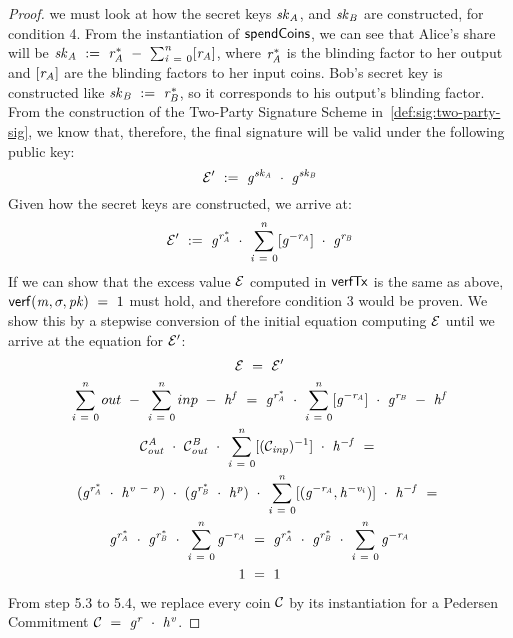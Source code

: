 \begin{proof}
    we must look at how the secret keys $\mathit{sk}_{\mathit{A}}$, and $\mathit{sk}_{\mathit{B}}$ are constructed, for condition 4.
    From the instantiation of $\mathsf{spendCoins}$, we can see that Alice's share will be $\mathit{sk}_{\mathit{A}} ~:=~ \mathit{r}_{\mathit{A}}^* ~-~ \sum_{\mathit{i} ~=~ 0}^{\mathit{n}} [\mathit{r}_{\mathit{A}}]$, where $\mathit{r}_{\mathit{A}}^*$ is the blinding factor to her output and $[\mathit{r}_{\mathit{A}}]$ are the blinding factors to her input coins.
    Bob's secret key is constructed like $\mathit{sk}_{\mathit{B}} ~:=~ \mathit{r}_{\mathit{B}}^*$, so it corresponds to his output's blinding factor.
    From the construction of the Two-Party Signature Scheme in~\cref{def:sig:two-party-sig}, we know that, therefore, the final signature will be valid under the following public key:
    \[ {\mathcal{E}}' ~:=~ \mathit{g}^{\mathit{sk}_{\mathit{A}}} ~\cdot~ \mathit{g}^{\mathit{sk}_{\mathit{B}}} \]
    Given how the secret keys are constructed, we arrive at:
    \[ {\mathcal{E}}' ~:=~ \mathit{g}^{\mathit{r}_{\mathit{A}}^*} ~\cdot~ \sum_{\mathit{i} ~=~ 0}^{\mathit{n}} [\mathit{g}^{- \mathit{r}_{\mathit{A}}}] ~\cdot~ \mathit{g}^{\mathit{r}_{\mathit{B}}} \]
    If we can show that the excess value $\mathcal{E}$ computed in $\mathsf{verfTx}$ is the same as above, $\mathsf{verf}(\mathit{m}, \sigma, \mathit{pk}) ~=~ 1$ must hold, and therefore condition 3 would be proven.
    We show this by a stepwise conversion of the initial equation computing $\mathcal{E}$ until we arrive at the equation for ${\mathcal{E}}'$:
    \begin{gather}
        \mathcal{E} ~=~ {\mathcal{E}}' \\
        \sum_{\mathit{i} ~=~ 0}^{\mathit{n}} out ~-~ \sum_{\mathit{i} ~=~ 0}^{\mathit{n}} inp ~-~ \mathit{h}^{\mathit{f}}  ~=~ \mathit{g}^{\mathit{r}_{\mathit{A}}^*} ~\cdot~ \sum_{\mathit{i} ~=~ 0}^{\mathit{n}} [\mathit{g}^{- \mathit{r}_{\mathit{A}}}] ~\cdot~ \mathit{g}^{\mathit{r}_{\mathit{B}}} ~-~ \mathit{h}^{\mathit{f}} \\
        \mathcal{C}_{\mathit{out}}^{\mathit{A}} ~\cdot~ \mathcal{C}_{\mathit{out}}^{\mathit{B}} ~\cdot~ \sum_{\mathit{i} ~=~ 0}^{\mathit{n}} [(\mathcal{C}_{\mathit{inp}})^{-1}] ~\cdot~ \mathit{h}^{- \mathit{f}}  ~=~\\
        (\mathit{g}^{\mathit{r}_{\mathit{A}}^*} ~\cdot~ \mathit{h}^{\mathit{v} ~-~ \mathit{p}}) ~\cdot~
        (\mathit{g}^{\mathit{r}_{\mathit{B}}^*} ~\cdot~ \mathit{h}^{\mathit{p}}) ~\cdot~
        \sum_{\mathit{i} ~=~ 0}^{\mathit{n}} [(\mathit{g}^{- \mathit{r}_{\mathit{A}}}, \mathit{h}^{- \mathit{v}_i})] ~\cdot~ \mathit{h}^{- \mathit{f}} ~=~ \\
        \mathit{g}^{\mathit{r}_{\mathit{A}}^*} ~\cdot~ \mathit{g}^{\mathit{r}_{\mathit{B}}^*} ~\cdot~ \sum_{\mathit{i} ~=~ 0}^{\mathit{n}} \mathit{g}^{- \mathit{r}_{\mathit{A}}} ~=~ \mathit{g}^{\mathit{r}_{\mathit{A}}^*} ~\cdot~ \mathit{g}^{\mathit{r}_{\mathit{B}}^*} ~\cdot~ \sum_{\mathit{i} ~=~ 0}^{\mathit{n}} \mathit{g}^{- \mathit{r}_{\mathit{A}}} \\
        1 ~=~ 1
    \end{gather}
    From step 5.3 to 5.4, we replace every coin $\mathcal{C}$ by its instantiation for a Pedersen Commitment $\mathcal{C} ~=~ \mathit{g}^{\mathit{r}} ~\cdot~ \mathit{h}^{\mathit{v}}$.


\end{proof}
